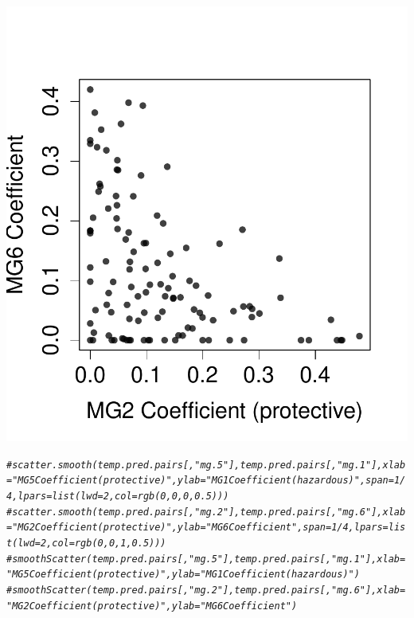 \documentclass{article}\usepackage[]{graphicx}\usepackage[]{color}
\makeatletter
\def\maxwidth{ %
  \ifdim\Gin@nat@width>\linewidth
    \linewidth
  \else
    \Gin@nat@width
  \fi
}
\newcommand{\hlcom}[1]{\textcolor[rgb]{0.678,0.584,0.686}{\textit{#1}}}%
\newenvironment{kframe}{%
 \def\at@end@of@kframe{}%
 \ifinner\ifhmode%
  \def\at@end@of@kframe{\end{minipage}}%
  \begin{minipage}{\columnwidth}%
 \fi\fi%
 \def\FrameCommand##1{\hskip\@totalleftmargin \hskip-\fboxsep
 \colorbox{shadecolor}{##1}\hskip-\fboxsep
     \hskip-\linewidth \hskip-\@totalleftmargin \hskip\columnwidth}%
 \MakeFramed {\advance\hsize-\width
   \@totalleftmargin\z@ \linewidth\hsize
   \@setminipage}}%
 {\par\unskip\endMakeFramed%
 \at@end@of@kframe}
\newenvironment{knitrout}{}{} %
\makeatother
\begin{document}
\begin{knitrout}
{\centering \includegraphics[width=\maxwidth]{figure/metagene-pairs-9} 

}


\begin{kframe}\begin{alltt}
\hlcom{#scatter.smooth(temp.pred.pairs[,"mg.5"], temp.pred.pairs[,"mg.1"], xlab = "MG5 Coefficient (protective)", ylab = "MG1 Coefficient (hazardous)", span = 1/4, lpars = list(lwd = 2, col = rgb(0, 0, 0, 0.5)))}
\hlcom{#scatter.smooth(temp.pred.pairs[,"mg.2"], temp.pred.pairs[,"mg.6"], xlab = "MG2 Coefficient (protective)", ylab = "MG6 Coefficient", span = 1/4, lpars = list(lwd = 2, col = rgb(0, 0, 1, 0.5)))}
\hlcom{#smoothScatter(temp.pred.pairs[,"mg.5"], temp.pred.pairs[,"mg.1"], xlab = "MG5 Coefficient (protective)", ylab = "MG1 Coefficient (hazardous)")}
\hlcom{#smoothScatter(temp.pred.pairs[,"mg.2"], temp.pred.pairs[,"mg.6"], xlab = "MG2 Coefficient (protective)", ylab = "MG6 Coefficient")}


\end{alltt}
\end{kframe}
\end{knitrout}
\end{document}
